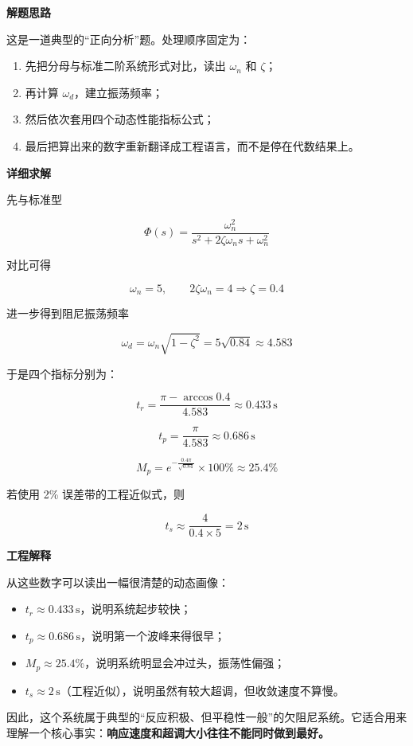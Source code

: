\documentclass[
  11pt]{article}
\providecommand{\tightlist}{%
  \setlength{\itemsep}{0pt}\setlength{\parskip}{0pt}}
\begin{document}
\textbf{解题思路}

这是一道典型的``正向分析''题。处理顺序固定为：

\begin{enumerate}
\def\labelenumi{\arabic{enumi}.}
\tightlist
\item
  先把分母与标准二阶系统形式对比，读出 \(\omega_n\) 和 \(\zeta\)；
\item
  再计算 \(\omega_d\)，建立振荡频率；
\item
  然后依次套用四个动态性能指标公式；
\item
  最后把算出来的数字重新翻译成工程语言，而不是停在代数结果上。
\end{enumerate}

\textbf{详细求解}

先与标准型

\[
\Phi(s) = \frac{\omega_n^2}{s^2 + 2\zeta\omega_n s + \omega_n^2}
\]

对比可得

\[
\omega_n = 5, \qquad 2\zeta\omega_n = 4 \Rightarrow \zeta = 0.4
\]

进一步得到阻尼振荡频率

\[
\omega_d = \omega_n\sqrt{1-\zeta^2} = 5\sqrt{0.84} \approx 4.583
\]

于是四个指标分别为：

\[
t_r = \frac{\pi - \arccos 0.4}{4.583} \approx 0.433\,\text{s}
\]

\[
t_p = \frac{\pi}{4.583} \approx 0.686\,\text{s}
\]

\[
M_p = e^{-\frac{0.4\pi}{\sqrt{0.84}}} \times 100\% \approx 25.4\%
\]

若使用 2\% 误差带的工程近似式，则

\[
t_s \approx \frac{4}{0.4 \times 5} = 2\,\text{s}
\]

\textbf{工程解释}

从这些数字可以读出一幅很清楚的动态画像：

\begin{itemize}
\tightlist
\item
  \(t_r \approx 0.433\,\text{s}\)，说明系统起步较快；
\item
  \(t_p \approx 0.686\,\text{s}\)，说明第一个波峰来得很早；
\item
  \(M_p \approx 25.4\%\)，说明系统明显会冲过头，振荡性偏强；
\item
  \(t_s \approx 2\,\text{s}\)（工程近似），说明虽然有较大超调，但收敛速度不算慢。
\end{itemize}

因此，这个系统属于典型的``反应积极、但平稳性一般''的欠阻尼系统。它适合用来理解一个核心事实：\textbf{响应速度和超调大小往往不能同时做到最好。}
\end{document}
